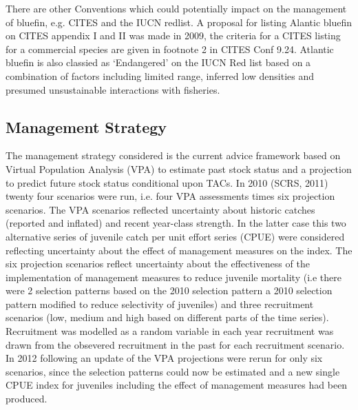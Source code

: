 \documentclass[a4paper,10pt]{article}
\begin{document}
There are other Conventions which could potentially impact on the management of bluefin, e.g. CITES and the IUCN redlist. A proposal for listing Alantic bluefin 
on CITES appendix I and II was made in 2009, the criteria for a CITES listing for a commercial species are given in footnote 2 in CITES Conf 9.24.
Atlantic bluefin is also classied as ‘Endangered’ on the IUCN Red list based on a combination of factors including limited range, inferred 
low densities and presumed unsustainable interactions with fisheries. 

\subsection*{Management Strategy}

The management strategy considered is the current advice framework based on Virtual Population Analysis (VPA) to estimate past stock status 
and a projection to predict future stock status conditional upon TACs. In 2010 (SCRS, 2011) twenty four scenarios were run, i.e. four VPA 
assessments times six projection scenarios. The VPA scenarios reflected uncertainty about historic catches (reported and inflated) and 
recent year-class strength. In the latter case this two alternative series of juvenile catch per unit effort series (CPUE) were considered 
reflecting uncertainty about the effect of management measures on the index.
The six projection scenarios reflect uncertainty about the effectiveness of the implementation of management measures to
reduce juvenile mortality (i.e there were 2 selection patterns based on the 2010 selection pattern a 2010 selection pattern
modified to reduce selectivity of juveniles) and three recruitment scenarios (low, medium and high based on different parts of the time series). 
Recruitment was modelled as
a random variable in each year recruitment was drawn from the obsevered recruitment in the past for each recruitment scenario.
In 2012 following an update of the VPA projections were rerun for only six scenarios, since the selection patterns could now be estimated 
and a new single CPUE index for juveniles including the effect of management measures had been produced.
\end{document}
